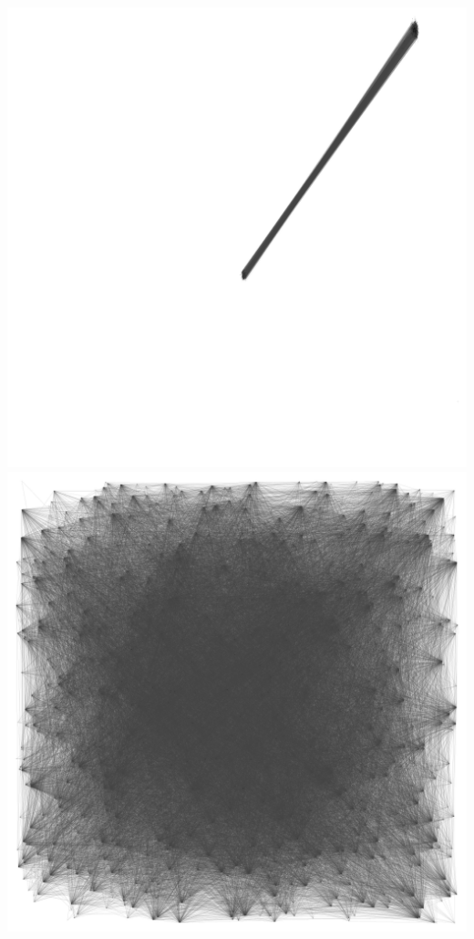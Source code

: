 \documentclass[12pt, a4paper]{article}
\begin{document}
\begin{multicols}{2}
  {\centering
  \includegraphics[width=\columnwidth]{src/youtube/hdg/comp/5_plot_drl}\\
  \label{fig:hdg_c7}}
  {\centering
  \includegraphics[width=\columnwidth]{src/youtube/hdg/comp/8_plot_random}\\
  \label{fig:hdg_c8}}
\end{multicols}
\end{document}

